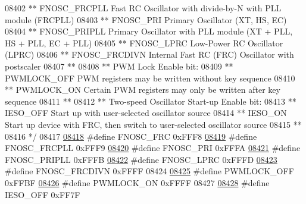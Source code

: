 \begin{DoxyCode}
{{{{08402 \textcolor{comment}{**     FNOSC\_FRCPLL         Fast RC Oscillator with divide-by-N with PLL module (FRCPLL) }
08403 \textcolor{comment}{**     FNOSC\_PRI            Primary Oscillator (XT, HS, EC)}
08404 \textcolor{comment}{**     FNOSC\_PRIPLL         Primary Oscillator with PLL module (XT + PLL, HS + PLL, EC + PLL)}
08405 \textcolor{comment}{**     FNOSC\_LPRC           Low-Power RC Oscillator (LPRC)}
08406 \textcolor{comment}{**     FNOSC\_FRCDIVN        Internal Fast RC (FRC) Oscillator with postscaler}
08407 \textcolor{comment}{**}
08408 \textcolor{comment}{**   PWM Lock Enable bit:}
08409 \textcolor{comment}{**     PWMLOCK\_OFF          PWM registers may be written without key sequence}
08410 \textcolor{comment}{**     PWMLOCK\_ON           Certain PWM registers may only be written after key sequence}
08411 \textcolor{comment}{**}
08412 \textcolor{comment}{**   Two-speed Oscillator Start-up Enable bit:}
08413 \textcolor{comment}{**     IESO\_OFF             Start up with user-selected oscillator source}
08414 \textcolor{comment}{**     IESO\_ON              Start up device with FRC, then switch to user-selected oscillator source}
08415 \textcolor{comment}{**}
08416 \textcolor{comment}{*/}
08417 
\hypertarget{a00015_source_l08418}{}\hyperlink{a00015_ad66b210abf2655398404f42610d89978}{08418} \textcolor{preprocessor}{#define FNOSC\_FRC            0xFFF8}
\hypertarget{a00015_source_l08419}{}\hyperlink{a00015_a07778c58ea92bd8b1a046a569c28d562}{08419} \textcolor{preprocessor}{#define FNOSC\_FRCPLL         0xFFF9}
\hypertarget{a00015_source_l08420}{}\hyperlink{a00015_a652808bfce54b4b230ec7bd0da729138}{08420} \textcolor{preprocessor}{#define FNOSC\_PRI            0xFFFA}
\hypertarget{a00015_source_l08421}{}\hyperlink{a00015_a9cda9f73a5496fc989a07ab24b903fef}{08421} \textcolor{preprocessor}{#define FNOSC\_PRIPLL         0xFFFB}
\hypertarget{a00015_source_l08422}{}\hyperlink{a00015_aa1c3ad35349778b98abf1c92ed17127e}{08422} \textcolor{preprocessor}{#define FNOSC\_LPRC           0xFFFD}
\hypertarget{a00015_source_l08423}{}\hyperlink{a00015_a61bfa791d1c7642fd0eb3fc3feb9a5c9}{08423} \textcolor{preprocessor}{#define FNOSC\_FRCDIVN        0xFFFF}
08424 
\hypertarget{a00015_source_l08425}{}\hyperlink{a00015_ad2e51cc85aacdf0e4121efbc51d2defa}{08425} \textcolor{preprocessor}{#define PWMLOCK\_OFF          0xFFBF}
\hypertarget{a00015_source_l08426}{}\hyperlink{a00015_ab58ddc0b061a884ea5d02e9f59a7d83a}{08426} \textcolor{preprocessor}{#define PWMLOCK\_ON           0xFFFF}
08427 
\hypertarget{a00015_source_l08428}{}\hyperlink{a00015_a75a6ce6820b919d14bff54221200da13}{08428} \textcolor{preprocessor}{#define IESO\_OFF             0xFF7F}
}}}}
\end{DoxyCode}
